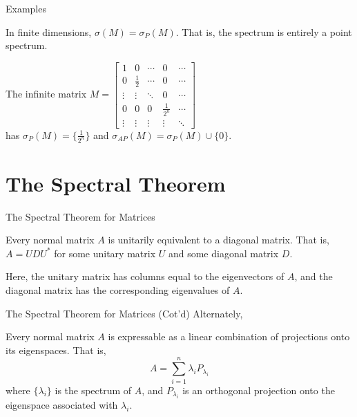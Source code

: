\documentclass{beamer}
\begin{document}
\begin{frame}{Examples}
    \begin{example}
        In finite dimensions, $\sigma(M) = \sigma_P(M)$. That is, the
        spectrum is entirely a point spectrum.
    \end{example}
    \begin{example}
        The infinite matrix
                $ M = 
                \begin{bmatrix}
                        1 & 0           & \cdots & 0 & \cdots  \\
                        0 & \frac{1}{2} & \cdots & 0 & \cdots  \\
                        \vdots & \vdots & \ddots & 0 & \cdots  \\
                        0 & 0           & 0      & \frac{1}{2^n} & \cdots \\
                        \vdots & \vdots   & \vdots  & \vdots & \ddots
                    \end{bmatrix}
                $
                \\
                has $\sigma_P(M) = \{\frac{1}{2^n}\}$ and
                $\sigma_{AP}(M) = \sigma_P(M) \cup \{0\}$.
    \end{example}
\end{frame}

\section{The Spectral Theorem}
\begin{frame}{The Spectral Theorem for Matrices}
    \begin{theorem}
        Every normal matrix $A$ is unitarily equivalent to a diagonal matrix.
        That is, $A = UDU^*$ for some unitary matrix $U$ and some diagonal
        matrix $D$.
    \end{theorem}
    Here, the unitary matrix has columns equal to the eigenvectors of $A$, and
    the diagonal matrix has the corresponding eigenvalues of $A$.

\end{frame}
\begin{frame}{The Spectral Theorem for Matrices (Cot'd)}
    Alternately,
    \begin{theorem}
        Every normal matrix $A$ is expressable as a linear combination of
        projections onto its eigenspaces. That is,
        \[
            A = \sum_{i=1}^n \lambda_i P_{\lambda_i}
        \]
        where $\{\lambda_i\}$ is the spectrum of $A$, and $P_{\lambda_i}$ is an
        orthogonal projection onto the eigenspace associated with $\lambda_i$.
    \end{theorem}

\end{frame}
\end{document}
